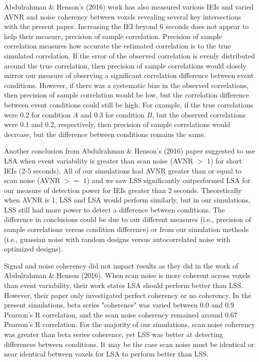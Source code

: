 \documentclass[10pt,letterpaper]{article}
\begin{document}
Abdulrahman \& Henson's (2016) work has also measured various IEIs and varied AVNR and noise coherency between voxels
revealing several key intersections with the present paper.
Increasing the IEI beyond 6 seconds does not appear to help their measure, precision of sample correlation.
Precision of sample correlation measures how accurate the estimated correlation is to the true
simulated correlation.
If the error of the observed correlation is evenly distributed around the
true correlation, then precision of sample correlations would closely mirror our measure of observing
a significant correlation difference between event conditions.
However, if there was a systematic bias in the observed correlations, then precision of sample correlation
would be low, but the correlation difference between event conditions could still be high.
For example, if the true correlations were 0.2 for condition $A$ and 0.3 for condition $B$, but
the observed correlations were 0.1 and 0.2, respectively, then precision of sample correlations would
decrease, but the difference between conditions remains the same.

Another conclusion from Abdulrahman \& Henson's (2016)\cite{Abdulrahman2016} paper suggested to
use LSA when event variability is greater than scan noise (AVNR $>$ 1) for short IEIs (2-5 seconds).
All of our simulations had AVNR greater than or equal to scan noise (AVNR $>=$ 1) and we saw
LSS significantly outperformed LSA for our measure of detection power for IEIs greater than 2 seconds.
Theoretically when AVNR is 1, LSS and LSA would perform similarly, but in our simulations,
LSS still had more power to detect a difference between conditions.
The difference in conclusions could be due to our different measures (i.e., precision of sample correlations versus condition difference)
or from our simulation methods (i.e., guassian noise with random designs versus autocorrelated noise with optimized designs).

Signal and noise coherency did not impact results as they did in the work of Abdulrahman \& Henson (2016)\cite{Abdulrahman2016}.
When scan noise is more coherent across voxels than event variability,
their work states LSA should perform better than LSS.
However, their paper only investigated perfect coherency or no coherency.
In the present simulations, beta series "coherence" was varied between 0.0 and 0.9 Pearson's R correlation,
and the scan noise coherency remained around 0.67 Pearson's R correlation.
For the majority of our simulations, scan noise coherency was greater than beta series
coherence, yet LSS was better at detecting differences between conditions.
It may be the case scan noise must be identical or near identical between voxels
for LSA to perform better than LSS.
\end{document}
